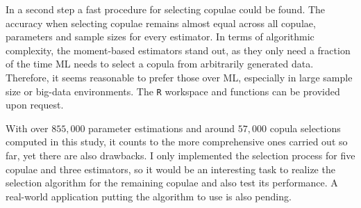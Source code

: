 In a second step a fast procedure for selecting copulae could be found. The accuracy when selecting copulae remains almost equal across all copulae, parameters and sample sizes for every estimator. In terms of algorithmic complexity, the moment-based estimators stand out, as they only need a fraction of the time ML needs to select a copula from arbitrarily generated data. Therefore, it seems reasonable to prefer those over ML, especially in large sample size or big-data environments. The \verb*|R| workspace and functions can be provided upon request.

With over $855,000$ parameter estimations and around $57,000$ copula selections computed in this study, it counts to the more comprehensive ones carried out so far, yet there are also drawbacks. I only implemented the selection process for five copulae and three estimators, so it would be an interesting task to realize the selection algorithm for the remaining copulae and also test its performance. A real-world application putting the algorithm to use is also pending. 